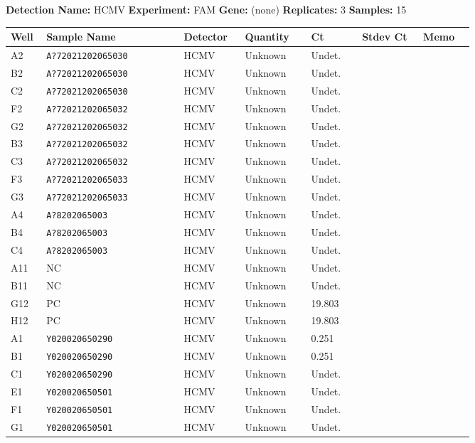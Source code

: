 \documentclass[UTF8,10pt,a4paper,fontset=fandol]{ctexart}
\begin{document}
\begin{center}
\small
\textbf{Detection Name:} HCMV \qquad
\textbf{Experiment:} FAM \qquad
\textbf{Gene:} (none) \qquad
\textbf{Replicates:} 3 \qquad
\textbf{Samples:} 15

\vspace{1em}

\begin{tabular}{|p{0.07\linewidth}|p{0.27\linewidth}|p{0.12\linewidth}|p{0.13\linewidth}|p{0.10\linewidth}|p{0.12\linewidth}|p{0.10\linewidth}|}
\hline
\textbf{Well} &
\textbf{Sample Name} &
\textbf{Detector} &
\textbf{Quantity} &
\textbf{Ct} &
\textbf{Stdev Ct} &
\textbf{Memo} \\
\hline
A2 & \texttt{A?72021202065030} & HCMV & Unknown & Undet. & & \\
\hline
B2 & \texttt{A?72021202065030} & HCMV & Unknown & Undet. & & \\
\hline
C2 & \texttt{A?72021202065030} & HCMV & Unknown & Undet. & & \\
\hline
F2 & \texttt{A?72021202065032} & HCMV & Unknown & Undet. & & \\
\hline
G2 & \texttt{A?72021202065032} & HCMV & Unknown & Undet. & & \\
\hline
B3 & \texttt{A?72021202065032} & HCMV & Unknown & Undet. & & \\
\hline
C3 & \texttt{A?72021202065032} & HCMV & Unknown & Undet. & & \\
\hline
F3 & \texttt{A?72021202065033} & HCMV & Unknown & Undet. & & \\
\hline
G3 & \texttt{A?72021202065033} & HCMV & Unknown & Undet. & & \\
\hline
A4 & \texttt{A?8202065003} & HCMV & Unknown & Undet. & & \\
\hline
B4 & \texttt{A?8202065003} & HCMV & Unknown & Undet. & & \\
\hline
C4 & \texttt{A?8202065003} & HCMV & Unknown & Undet. & & \\
\hline
A11 & NC & HCMV & Unknown & Undet. & & \\
\hline
B11 & NC & HCMV & Unknown & Undet. & & \\
\hline
G12 & PC & HCMV & Unknown & 19.803 & & \\
\hline
H12 & PC & HCMV & Unknown & 19.803 & & \\
\hline
A1 & \texttt{Y020020650290} & HCMV & Unknown & 0.251 & & \\
\hline
B1 & \texttt{Y020020650290} & HCMV & Unknown & 0.251 & & \\
\hline
C1 & \texttt{Y020020650290} & HCMV & Unknown & Undet. & & \\
\hline
E1 & \texttt{Y020020650501} & HCMV & Unknown & Undet. & & \\
\hline
F1 & \texttt{Y020020650501} & HCMV & Unknown & Undet. & & \\
\hline
G1 & \texttt{Y020020650501} & HCMV & Unknown & Undet. & & \\
\hline
\end{tabular}
\end{center}
\end{document}
